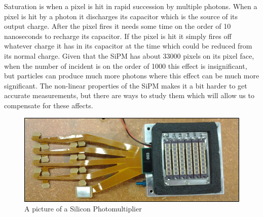 Saturation is when a pixel is hit in rapid succession by multiple photons. When a pixel is hit by a photon it discharges its capacitor which is the source of its output charge. After the pixel fires it needs some time on the order of 10 nanoseconds to recharge its capacitor. If the pixel is hit it simply fires off whatever charge it has in its capacitor at the time which could be reduced from its normal charge. Given that the SiPM has about 33000 pixels on its pixel face, when the number of incident is on the order of 1000 this effect is insignificant, but particles can produce much more photons where this effect can be much more significant. The non-linear properties of the SiPM makes it a bit harder to get accurate measurements, but there are ways to study them which will allow us to compensate for these affects.

\begin{figure}
\centering
\includegraphics[width=\linewidth]{Figures/SiPM.jpg}
\caption{A picture of a Silicon Photomultiplier}
\label{fig:SiPM}
\end{figure}




